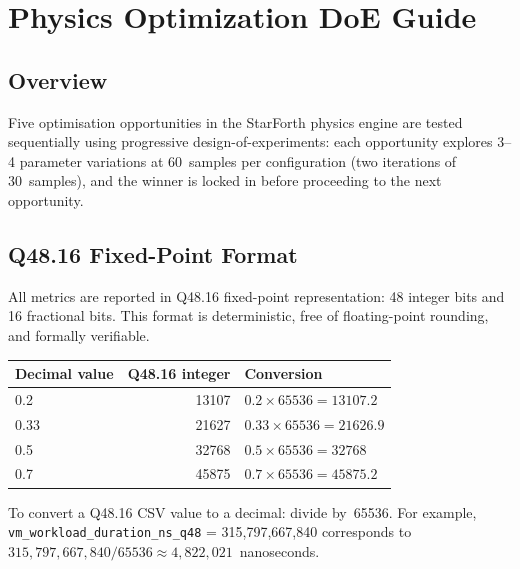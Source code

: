 
\section{Physics Optimization DoE Guide}
\label{sec:physics-opt-doe-guide}

\subsection{Overview}

Five optimisation opportunities in the StarForth physics engine are tested
sequentially using progressive design-of-experiments: each opportunity
explores 3--4 parameter variations at 60~samples per configuration (two
iterations of 30~samples), and the winner is locked in before proceeding to
the next opportunity.

\subsection{Q48.16 Fixed-Point Format}

All metrics are reported in Q48.16 fixed-point representation: 48 integer
bits and 16 fractional bits. This format is deterministic, free of
floating-point rounding, and formally verifiable.

\begin{center}
\begin{tabular}{lrl}
\toprule
Decimal value & Q48.16 integer & Conversion \\
\midrule
0.2  & 13107 & $0.2 \times 65536 = 13107.2$ \\
0.33 & 21627 & $0.33 \times 65536 = 21626.9$ \\
0.5  & 32768 & $0.5 \times 65536 = 32768$ \\
0.7  & 45875 & $0.7 \times 65536 = 45875.2$ \\
\bottomrule
\end{tabular}
\end{center}

To convert a Q48.16 CSV value to a decimal: divide by~65536. For example,
\texttt{vm\_workload\_duration\_ns\_q48} = 315{,}797{,}667{,}840 corresponds
to $315{,}797{,}667{,}840 / 65536 \approx 4{,}822{,}021$~nanoseconds.

